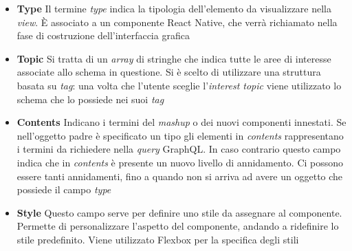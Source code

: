 \begin{itemize}
	\item \textbf{Type}
	Il termine \emph{type} indica la tipologia dell'elemento da visualizzare nella \emph{view}. È associato a un componente React Native, che verrà richiamato nella fase di costruzione dell'interfaccia grafica
	\item \textbf{Topic}
	Si tratta di un \emph{array} di stringhe che indica tutte le aree di interesse associate allo schema in questione. Si è scelto di utilizzare una struttura basata su \emph{tag}: una volta che l’utente sceglie l’\emph{interest topic} viene utilizzato lo schema che lo possiede nei suoi \emph{tag} 
	\item \textbf{Contents}
	Indicano i termini del \emph{mashup} o dei nuovi componenti innestati. Se nell'oggetto padre è specificato un tipo gli elementi in \emph{contents} rappresentano i termini da richiedere nella \emph{query} GraphQL. In caso contrario questo campo indica che in \emph{contents} è presente un nuovo livello di annidamento. Ci possono essere tanti annidamenti, fino a quando non si arriva ad avere un oggetto che possiede il campo \emph{type}
	\item \textbf{Style}
	Questo campo serve per definire uno stile da assegnare al componente. Permette di personalizzare l’aspetto del componente, andando a ridefinire lo stile predefinito. Viene utilizzato Flexbox per la specifica degli stili
\end{itemize}


